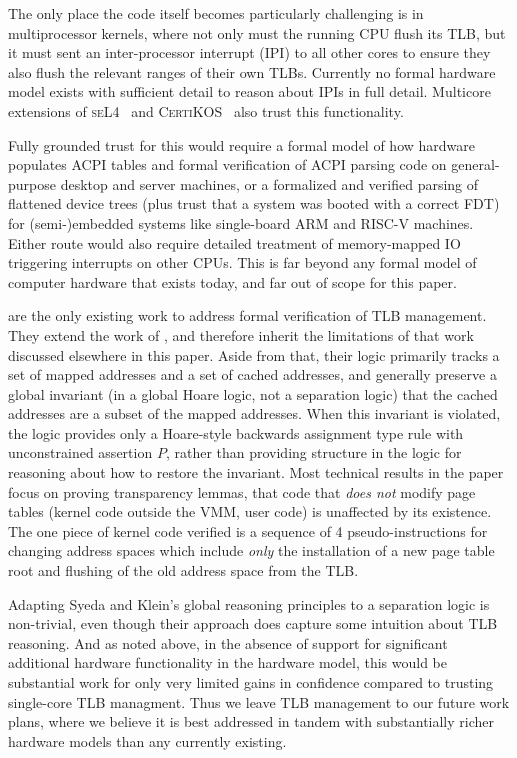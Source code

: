 \documentclass[acmsmall,screen,nonacm,review,anonymous]{acmart}
\begin{document}
The only place the code itself becomes particularly challenging is in multiprocessor kernels, where
not only must the running CPU flush its TLB, but it must sent an inter-processor interrupt (IPI) to all
other cores to ensure they also flush the relevant ranges of their own TLBs.
Currently no formal hardware model exists with sufficient detail to reason about IPIs in full detail.
Multicore extensions of \textsc{seL4}~\cite{von2013clustered} and \textsc{CertiKOS}~\cite{gu2016certikos} also trust this functionality.

Fully grounded trust for this would require a formal model of how hardware populates ACPI tables and formal verification of ACPI
parsing code on general-purpose desktop and server machines, or a formalized and verified
parsing of flattened device trees (plus trust that a system was booted with a correct FDT) for (semi-)embedded systems like single-board
ARM and RISC-V machines. Either route would also require detailed treatment of memory-mapped IO triggering
interrupts on other CPUs. This is far beyond any formal model of computer hardware that exists today,
and far out of scope for this paper.


\citet{syeda2020formal,syeda2018program} are the only existing work to address formal verification of TLB management.
They extend the work of \citet{kolanski08ssv,kolanski09tphols,kolanski09tphols}, and therefore inherit the limitations of that work discussed
elsewhere in this paper. Aside from that, their logic primarily tracks a set of mapped addresses and a set of
cached addresses, and generally preserve a global invariant (in a global Hoare logic, not a separation logic)
that the cached addresses are a subset of the mapped addresses. When this invariant is violated, the logic provides only
a Hoare-style backwards assignment type rule with unconstrained assertion $P$, rather than providing structure in the logic
for reasoning about how to restore the invariant. Most technical results in the paper focus on proving
transparency lemmas, that code that \emph{does not} modify page tables (kernel code outside the VMM, user code)
is unaffected by its existence. The one piece of kernel code verified is a sequence of 4 pseudo-instructions for changing address spaces
which include \emph{only} the installation of a new page table root and flushing of the old address space from the TLB.

Adapting Syeda and Klein's global reasoning principles to a separation logic is non-trivial, even though their approach
does capture some intuition about TLB reasoning. And as noted above, in the absence of support for significant additional
hardware functionality in the hardware model, this would be substantial work for only very limited gains in confidence compared
to trusting single-core TLB managment.
Thus we leave TLB management to our future work plans, where we believe it is best addressed in tandem with substantially
richer hardware models than any currently existing.
\end{document}
